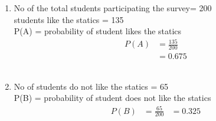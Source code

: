 \renewcommand{\theequation}{\theenumi}
\begin{enumerate}[label=\arabic*.,ref=\thesubsection.\theenumi]
\item No of the total students participating the survey=
200
\\
students like the statics = 135
\\
P(A) = probability of student likes the statics
\begin{align}
P\left(A\right) &= \frac{135}{200}
\\
&= 0.675
\end{align}
\\
\item No of students do not like the statics = 65
\\
P(B) = probability of student does not like the statics
\begin{align}
P\left(B\right) &= \frac{65}{200}
&= 0.325
\end{align}
\end{enumerate}
